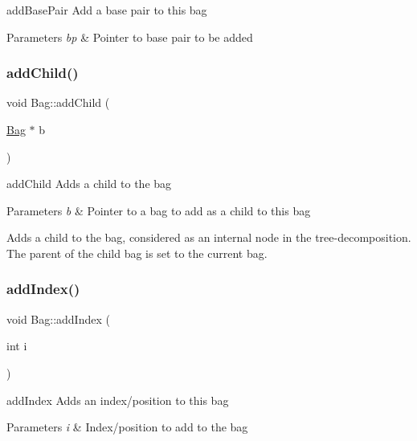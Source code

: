 add\+Base\+Pair Add a base pair to this bag 


\begin{DoxyParams}{Parameters}
{\em bp} & Pointer to base pair to be added \\
\hline
\end{DoxyParams}
\mbox{\label{class_bag_a36747193c7212f45b68552c3ea31fd70}} 
\subsubsection{\texorpdfstring{add\+Child()}{addChild()}}
{\footnotesize\ttfamily void Bag\+::add\+Child (\begin{DoxyParamCaption}\item[{\hyperlink{class_bag}{Bag} $\ast$}]{b }\end{DoxyParamCaption})}



add\+Child Adds a child to the bag 


\begin{DoxyParams}{Parameters}
{\em b} & Pointer to a bag to add as a child to this bag\\
\hline
\end{DoxyParams}
Adds a child to the bag, considered as an internal node in the tree-\/decomposition. The parent of the child bag is set to the current bag. \mbox{\label{class_bag_a4f5fcc1b48aeb967653a0d5364254562}} 
\subsubsection{\texorpdfstring{add\+Index()}{addIndex()}}
{\footnotesize\ttfamily void Bag\+::add\+Index (\begin{DoxyParamCaption}\item[{int}]{i }\end{DoxyParamCaption})}



add\+Index Adds an index/position to this bag 


\begin{DoxyParams}{Parameters}
{\em i} & Index/position to add to the bag \\
\hline
\end{DoxyParams}
\mbox{\label{class_bag_a79094c130b1fd55e49afeeafa70c454b}} 
